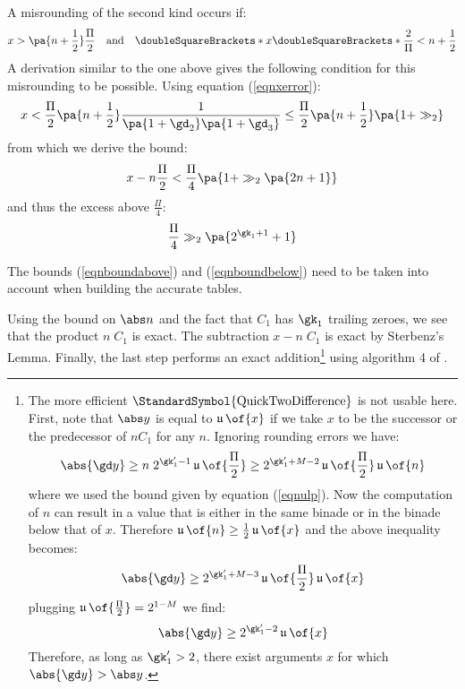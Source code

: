 \documentclass[10pt, a4paper, twoside]{basestyle}
\DeclareMathOperator{\ULP}{\mathfrak u}
\DeclareMathOperator{\quicktwodifference}{\StandardSymbol{QuickTwoDifference}}
\newcommand{\round}[1]{\doubleSquareBrackets*{#1}}
\begin{document}
A misrounding of the second kind occurs if:
\[
x > \pa{n + \frac{1}{2}}\frac{\Pi}{2} \quad \text{and} \quad \round{x \round{\frac{2}{\Pi}}} < n + \frac{1}{2}
\]
A derivation similar to the one above gives the following condition for this misrounding to be possible.  Using equation (\ref{eqnxerror}):
\[
x < \frac{\Pi}{2} \pa{n + \frac{1}{2}} \frac{1}{\pa{1 + \gd_2} \pa{1 + \gd_3}} \leq \frac{\Pi}{2} \pa{n + \frac{1}{2}} \pa{1 + \gg_2}
\]
from which we derive the bound:
\[
x - n \frac{\Pi}{2} < \frac{\Pi}{4} \pa{1 + \gg_2 \pa{2 n + 1}}
\]
and thus the excess above $\frac{\Pi}{4}$:
\begin{equation}
\frac{\Pi}{4} \gg_2 \pa{2^{\gk_1 + 1} + 1}
\label{eqnboundbelow}
\end{equation}

The bounds (\ref{eqnboundabove}) and (\ref{eqnboundbelow}) need to be taken into account when building the accurate tables.

Using the bound on $\abs n$ and the fact that $C_1$ has $\gk_1$ trailing zeroes, we see that the product $n \; C_1$ is exact.  The subtraction $x - n \; C_1$ is exact by Sterbenz's Lemma.  Finally, the last step performs an exact addition\footnote{The more efficient $\quicktwodifference$ is not usable here.  First, note that $\abs y$ is equal to $\ULP\of{x}$ if we take $x$ to be the successor or the predecessor of $n C_1$ for any $n$. Ignoring rounding errors we have:
\[ 
\abs{\gd y} \geq n \; 2^{\gk'_1 - 1} \ULP\of{\frac{\Pi}{2}} \geq 2^{\gk'_1 + M - 2} \ULP\of{\frac{\Pi}{2}} \ULP\of{n}
\]
where we used the bound given by equation (\ref{eqnulp}).  Now the computation of $n$ can result in a value that is either in the same binade or in the binade below that of $x$.  Therefore $\ULP\of{n} \geq \frac{1}{2} \ULP\of{x}$ and the above inequality becomes:
\[
\abs{\gd y} \geq 2^{\gk'_1 + M - 3} \ULP\of{\frac{\Pi}{2}} \ULP\of{x}
\]
plugging $\ULP\of{\frac{\Pi}{2}} = 2^{1 - M}$ we find:
\[
\abs{\gd y} \geq 2^{\gk'_1 - 2} \ULP\of{x}
\]
Therefore, as long as $\gk'_1 > 2$, there exist arguments $x$ for which $\abs{\gd y} > \abs y$.
} using algorithm 4 of \cite{HidaLiBailey2007}.
\end{document}
